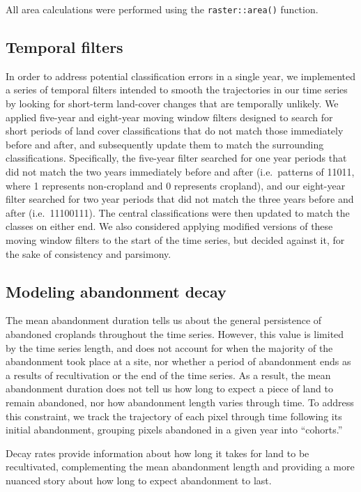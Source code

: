 \documentclass[9pt,twocolumn,twoside,]{pnas-new}
\begin{document}
All area calculations were performed using the \texttt{raster::area()} function.

\hypertarget{temporal-filters}{%
\subsection{Temporal filters}\label{temporal-filters}}

In order to address potential classification errors in a single year, we implemented a series of temporal filters intended to smooth the trajectories in our time series by looking for short-term land-cover changes that are temporally unlikely.
We applied five-year and eight-year moving window filters designed to search for short periods of land cover classifications that do not match those immediately before and after, and subsequently update them to match the surrounding classifications.
Specifically, the five-year filter searched for one year periods that did not match the two years immediately before and after (i.e.~patterns of 11011, where 1 represents non-cropland and 0 represents cropland), and our eight-year filter searched for two year periods that did not match the three years before and after (i.e.~11100111).
The central classifications were then updated to match the classes on either end.
We also considered applying modified versions of these moving window filters to the start of the time series, but decided against it, for the sake of consistency and parsimony.

\hypertarget{decay-models-si}{%
\subsection{Modeling abandonment decay}\label{decay-models-si}}

The mean abandonment duration tells us about the general persistence of abandoned croplands throughout the time series.
However, this value is limited by the time series length, and does not account for when the majority of the abandonment took place at a site, nor whether a period of abandonment ends as a results of recultivation or the end of the time series.
As a result, the mean abandonment duration does not tell us how long to expect a piece of land to remain abandoned, nor how abandonment length varies through time.
To address this constraint, we track the trajectory of each pixel through time following its initial abandonment, grouping pixels abandoned in a given year into ``cohorts.''

Decay rates provide information about how long it takes for land to be recultivated, complementing the mean abandonment length and providing a more nuanced story about how long to expect abandonment to last.
\end{document}
